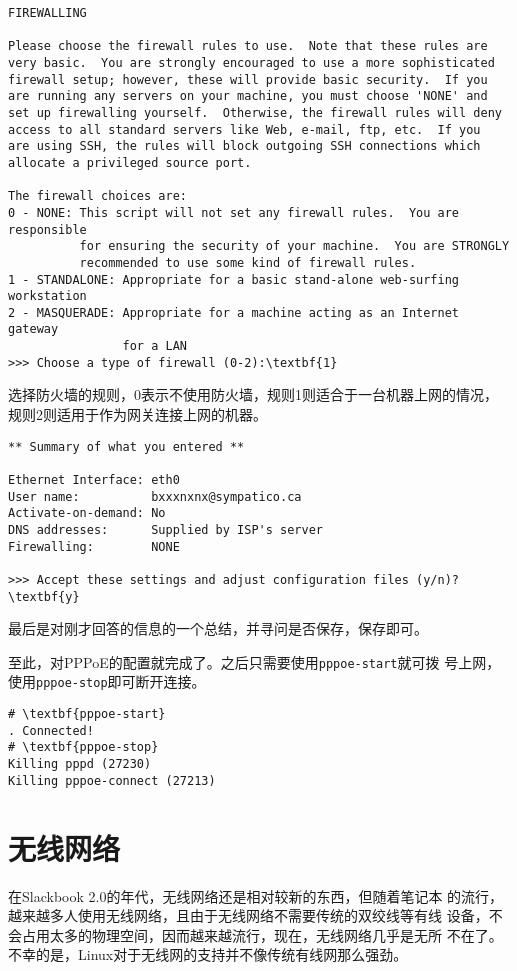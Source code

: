 \begin{Verbatim}[frame=single,commandchars=\\\{\}]
FIREWALLING

Please choose the firewall rules to use.  Note that these rules are
very basic.  You are strongly encouraged to use a more sophisticated
firewall setup; however, these will provide basic security.  If you
are running any servers on your machine, you must choose 'NONE' and
set up firewalling yourself.  Otherwise, the firewall rules will deny
access to all standard servers like Web, e-mail, ftp, etc.  If you
are using SSH, the rules will block outgoing SSH connections which
allocate a privileged source port.

The firewall choices are:
0 - NONE: This script will not set any firewall rules.  You are responsible
          for ensuring the security of your machine.  You are STRONGLY
          recommended to use some kind of firewall rules.
1 - STANDALONE: Appropriate for a basic stand-alone web-surfing workstation
2 - MASQUERADE: Appropriate for a machine acting as an Internet gateway
                for a LAN
>>> Choose a type of firewall (0-2):\textbf{1} 
\end{Verbatim}
选择防火墙的规则，0表示不使用防火墙，规则1则适合于一台机器上网的情况，
规则2则适用于作为网关连接上网的机器。
\begin{Verbatim}[frame=single,commandchars=\\\{\}]
** Summary of what you entered **

Ethernet Interface: eth0
User name:          bxxxnxnx@sympatico.ca
Activate-on-demand: No
DNS addresses:      Supplied by ISP's server
Firewalling:        NONE

>>> Accept these settings and adjust configuration files (y/n)?\textbf{y}
\end{Verbatim}
最后是对刚才回答的信息的一个总结，并寻问是否保存，保存即可。

至此，对PPPoE的配置就完成了。之后只需要使用\texttt{pppoe-start}就可拨
号上网，使用\texttt{pppoe-stop}即可断开连接。
\begin{Verbatim}[frame=single,commandchars=\\\{\}]
# \textbf{pppoe-start}
. Connected!
# \textbf{pppoe-stop}
Killing pppd (27230)
Killing pppoe-connect (27213)
\end{Verbatim}

\section{无线网络}
\label{sec:networkConfiguration:wireless}
在Slackbook 2.0的年代，无线网络还是相对较新的东西，但随着笔记本
的流行，越来越多人使用无线网络，且由于无线网络不需要传统的双绞线等有线
设备，不会占用太多的物理空间，因而越来越流行，现在，无线网络几乎是无所
不在了。不幸的是，Linux对于无线网的支持并不像传统有线网那么强劲。

